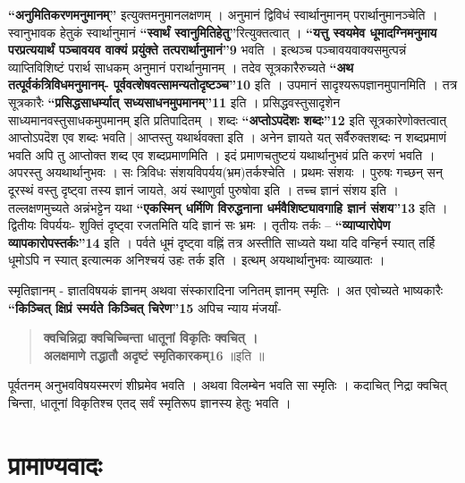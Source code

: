 \textbf{“अनुमितिकरणमनुमानम्”} इत्युक्तमनुमानलक्षणम् । अनुमानं द्विविधं स्वार्थानुमानम् परार्थानुमानञ्चेति । स्वानुभावक हेतुकं स्वार्थानुमानं \textbf{“स्वार्थं स्वानुमितिहेतु”}रित्युक्तत्वात् । \textbf{“यत्तु स्वयमेव धूमादग्निमनुमाय परप्रत्ययार्थं पञ्चावयव वाक्यं प्रयुंक्ते तत्परार्थानुमानं”9} भवति । इत्थञ्च पञ्चावयवाक्यसमुत्पन्नं व्याप्तिविशिष्टं परार्थ साधकम् अनुमानं परार्थानुमानम् । तदेव सूत्रकारैरुच्यते \textbf{“अथ तत्पूर्वकंत्रिविधमनुमानम्- पूर्ववत्शेषवत्सामन्यतोदृष्टञ्च”10} इति । उपमानं सादृश्यरूपज्ञानमुपानमिति । तत्र सूत्रकारैः \textbf{“प्रसिद्धसाधर्म्यात् सध्यसाधनमुपमानम्”11} इति । प्रसिद्धवस्तुसादृशेन साध्यमानवस्तुसाधकमुपमानम् इति प्रतिपादितम् । शब्दः \textbf{“अप्तोऽपदॆशः शब्दः”12} इति सूत्रकारेणोक्तत्वात् आप्तोऽपदॆश एव शब्दः भवति | आप्तस्तु यथार्थवक्ता इति । अनेन ज्ञायते यत् सर्वैरुक्तशब्दः न शब्दप्रमाणं भवति अपि तु आप्तोक्त शब्द एव शब्दप्रमाणमिति । इदं प्रमाणचतुष्टयं यथार्थानुभवं प्रति करणं भवति । अपरस्तु अयथार्थानुभवः । सः त्रिविधः संशयविपर्यय(भ्रम)तर्कश्चेति । प्रथमः संशयः । पुरुषः गच्छन् सन् दूरस्थं वस्तु दृष्ट्वा तस्य ज्ञानं जायते, अयं स्थाणुर्वा पुरुषोवा इति । तच्च ज्ञानं संशय इति । तल्लक्षणमुच्यते अन्नंभट्टेन यथा \textbf{“एकस्मिन् धर्मिणि विरुद्धनाना धर्मवैशिष्ट्यावगाहि ज्ञानं संशय”13} इति । द्वितीयः विपर्ययः- शुक्तिं दृष्ट्वा रजतमिति यदि ज्ञानं सः भ्रमः । तृतीयः तर्कः – \textbf{“व्याप्यारोपेण व्यापकारोपस्तर्कः”14} इति । पर्वते धूमं दृष्ट्वा वह्निं तत्र अस्तीति साध्यते यथा यदि वन्हिर्न स्यात् तर्हि धूमोऽपि न स्यात् इत्यात्मक अनिश्चयं उहः तर्क इति । इत्थम् अयथार्थानुभवः व्याख्यातः ।

स्मृतिज्ञानम् - ज्ञातविषयकं ज्ञानम् अथवा संस्कारादिना जनितम् ज्ञानम् स्मृतिः । अत एवोच्यते भाष्यकारैः \textbf{“किञ्चित् क्षिप्रं स्मर्यते किञ्चित् चिरेण”15} अपिच न्याय मंजर्यां-
\begin{verse}
\textbf{क्वचिन्निद्रा क्वचिच्चिन्ता धातूनां विकृतिः क्वचित् ।\\
अलक्षमाणे तद्धातौ अदृष्टं स्मृतिकारकम्16} ॥इति ॥
\end{verse}
पूर्वतनम् अनुभवविषयस्मरणं शीघ्रमेव भवति । अथवा विलम्बेन भवति सा स्मृतिः । कदाचित् निद्रा क्वचित् चिन्ता, धातूनां विकृतिश्च एतद् सर्वं स्मृतिरूप ज्ञानस्य हेतुः भवति ।

\section*{प्रामाण्यवादः}

